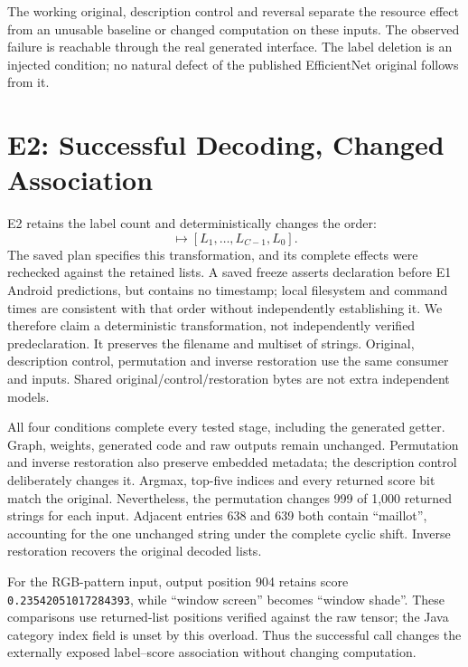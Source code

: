 \documentclass[10pt,conference]{IEEEtran}
\newcommand{\code}[1]{\texttt{#1}}
\begin{document}
The working original, description control and reversal separate the resource effect from an unusable baseline or changed computation on these inputs. The observed failure is reachable through the real generated interface. The label deletion is an injected condition; no natural defect of the published EfficientNet original follows from it.

\section{E2: Successful Decoding, Changed Association}
\label{sec:e2}
E2 retains the label count and deterministically changes the order:
\begin{equation}
[L_0,L_1,\ldots,L_{C-1}]
\mapsto[L_1,\ldots,L_{C-1},L_0].
\end{equation}
The saved plan specifies this transformation, and its complete effects were rechecked against the retained lists. A saved freeze asserts declaration before E1 Android predictions, but contains no timestamp; local filesystem and command times are consistent with that order without independently establishing it. We therefore claim a deterministic transformation, not independently verified predeclaration. It preserves the filename and multiset of strings. Original, description control, permutation and inverse restoration use the same consumer and inputs. Shared original/control/restoration bytes are not extra independent models.

All four conditions complete every tested stage, including the generated getter. Graph, weights, generated code and raw outputs remain unchanged. Permutation and inverse restoration also preserve embedded metadata; the description control deliberately changes it. Argmax, top-five indices and every returned score bit match the original. Nevertheless, the permutation changes 999 of 1,000 returned strings for each input. Adjacent entries 638 and 639 both contain ``maillot'', accounting for the one unchanged string under the complete cyclic shift. Inverse restoration recovers the original decoded lists.

For the RGB-pattern input, output position 904 retains score \code{0.23542051017284393}, while ``window screen'' becomes ``window shade''. These comparisons use returned-list positions verified against the raw tensor; the Java category index field is unset by this overload. Thus the successful call changes the externally exposed label--score association without changing computation.
\end{document}
